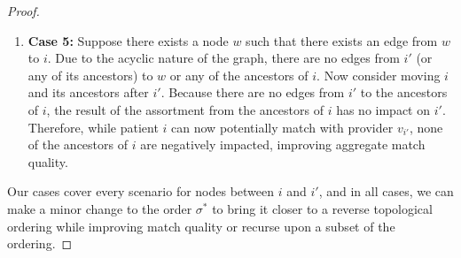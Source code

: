 \documentclass[11pt]{article}
\begin{document}
\begin{proof}
\begin{enumerate}
    Move $i'$ and all of its descendants before $i$ in the graph; there are no edges from the descendants of $i'$ to $i$. 
    Therefore, this flips the order of $i$ and $i'$ without impacting any of the descendants; because only $i$ and $i'$ are impacted by this change (as the descendants of $i'$ are not impacted by $i$), such a change can only increase the expected match quality, as $i$ can potentially match with $v_{i'}$. 
    \item \textbf{Case 5:} Suppose there exists a node $w$ such that there exists an edge from $w$ to $i$. 
    Due to the acyclic nature of the graph, there are no edges from $i'$ (or any of its ancestors) to $w$ or any of the ancestors of $i$. 
    Now consider moving $i$ and its ancestors after $i'$. 
    Because there are no edges from $i'$ to the ancestors of $i$, the result of the assortment from the ancestors of $i$ has no impact on $i'$. 
    Therefore, while patient $i$ can now potentially match with provider $v_{i'}$, none of the ancestors of $i$ are negatively impacted, improving aggregate match quality.  
\end{enumerate}
Our cases cover every scenario for nodes between $i$ and $i'$, and in all cases, we can make a minor change to the order $\sigma^{*}$ to bring it closer to a reverse topological ordering while improving match quality or recurse upon a subset of the ordering. 
\end{proof}
\end{document}
